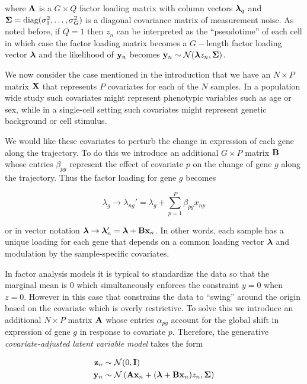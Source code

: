 where $\bm{\Lambda}$ is a $G \times Q$ factor loading matrix with column vectors $\bm{\lambda}_q$ and $\bm{\Sigma} = \text{diag}(\sigma_1^2, \ldots, \sigma_G^2)$ is a diagonal covariance matrix of measurement noise. As noted before, if $Q = 1$ then $z_n$ can be interpreted as the ``pseudotime'' of each cell in which case the factor loading matrix becomes a $G-$length factor loading vector $\bm{\lambda}$ and the likelihood of $\mathbf{y}_n$ becomes $\mathbf{y}_n  \sim \mathcal{N}(\bm{\lambda} z_n, \bm{\Sigma})$.

We now consider the case mentioned in the introduction that we have an $N \times P$ matrix $\mathbf{X}$ that represents $P$ covariates for each of the $N$ samples. In a population wide study such covariates might represent phenotypic variables such as age or sex, while in a single-cell setting such covariates might represent genetic background or cell stimulus.

We would like these covariates to perturb the change in expression of each gene along the trajectory. To do this we introduce an additional $G \times P$ matrix $\mathbf{B}$ whose entries $\beta_{pg}$ represent the effect of covariate $p$ on the change of gene $g$ along the trajectory. Thus the factor loading for gene $g$ becomes

\begin{equation}
  \lambda_g \rightarrow \lambda_{ng}' = \lambda_g + \sum_{p=1}^P \beta_{pg} x_{np}
\end{equation}

or in vector notation  $\bm{\lambda} \rightarrow \bm{\lambda}'_n = \bm{\lambda} + \mathbf{B} \mathbf{x}_n$. In other words, each sample has a unique loading for each gene that depends on a common loading vector $\bm{\lambda}$ and modulation by the sample-specific covariates.

In factor analysis models it is typical to standardize the data so that the marginal mean is 0 which simultaneously enforces the constraint $y=0$ when $z=0$. However in this case that constrains the data to ``swing'' around the origin based on the covariate which is overly restrictive. To solve this we introduce an additional $N \times P$ matrix $\mathbf{A}$ whose entries $\alpha_{pg}$ account for the global shift in expression of gene $g$ in response to covariate $p$. Therefore, the generative \emph{covariate-adjusted latent variable model} takes the form

\begin{equation}
  \begin{aligned}
\mathbf{z}_n & \sim \mathcal{N}(0, \mathbf{I}) \\
\mathbf{y}_n & \sim \mathcal{N}\left( \mathbf{A} \mathbf{x}_n + (\bm{\lambda} + \mathbf{B} \mathbf{x}_n) z_n, \bm{\Sigma}\right)
  \end{aligned} \label{eq:clvm}
\end{equation}

